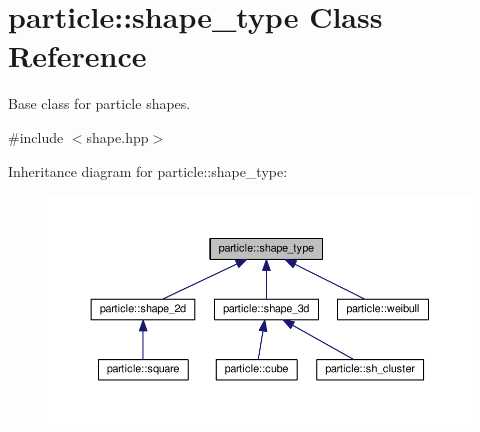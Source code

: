 \hypertarget{classparticle_1_1shape__type}{}\section{particle\+:\+:shape\+\_\+type Class Reference}
\label{classparticle_1_1shape__type}


Base class for particle shapes.  




{\ttfamily \#include $<$shape.\+hpp$>$}



Inheritance diagram for particle\+:\+:shape\+\_\+type\+:
\nopagebreak
\begin{figure}[H]
\begin{center}
\leavevmode
\includegraphics[width=350pt]{d8/d47/classparticle_1_1shape__type__inherit__graph}
\end{center}
\end{figure}
